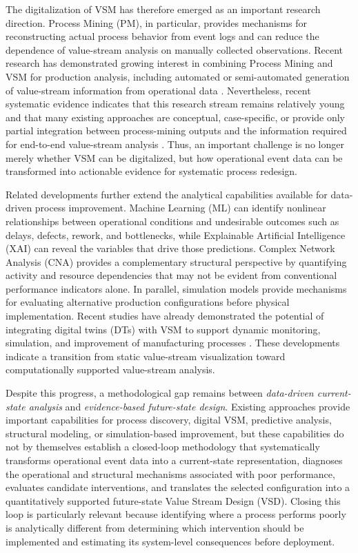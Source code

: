 \documentclass[pdflatex,iicol,Numbered,sn-basic]{sn-jnl}
\begin{document}
The digitalization of VSM has therefore emerged as an important research
direction. Process Mining (PM), in particular, provides mechanisms for
reconstructing actual process behavior from event logs and can reduce the
dependence of value-stream analysis on manually collected observations.
Recent research has demonstrated growing interest in combining Process Mining
and VSM for production analysis, including automated or semi-automated
generation of value-stream information from operational data
\cite{Teriete2026VSMProcessMining}. Nevertheless, recent systematic evidence indicates
that this research stream remains relatively young and that many existing
approaches are conceptual, case-specific, or provide only partial integration
between process-mining outputs and the information required for end-to-end
value-stream analysis \cite{Teriete2026VSMProcessMining}. Thus, an important challenge
is no longer merely whether VSM can be digitalized, but how operational event
data can be transformed into actionable evidence for systematic process
redesign.

Related developments further extend the analytical capabilities available for
data-driven process improvement. Machine Learning (ML) can identify nonlinear
relationships between operational conditions and undesirable outcomes such as
delays, defects, rework, and bottlenecks, while Explainable Artificial
Intelligence (XAI) can reveal the variables that drive those predictions.
Complex Network Analysis (CNA) provides a complementary
structural perspective by quantifying activity and resource dependencies that
may not be evident from conventional performance indicators alone. In parallel,
simulation models provide mechanisms for
evaluating alternative production configurations before physical implementation.
Recent studies have already demonstrated the potential of integrating digital twins (DTs)
with VSM to support dynamic monitoring, simulation, and improvement of
manufacturing processes \cite{Reslan2025VSMDigitalTwin}. These developments indicate
a transition from static value-stream visualization toward computationally
supported value-stream analysis.

Despite this progress, a methodological gap remains between \emph{data-driven
current-state analysis} and \emph{evidence-based future-state design}. Existing
approaches provide important capabilities for process discovery, digital VSM,
predictive analysis, structural modeling, or simulation-based improvement, but
these capabilities do not by themselves establish a closed-loop methodology
that systematically transforms operational event data into a current-state
representation, diagnoses the operational and structural mechanisms associated
with poor performance, evaluates candidate interventions, and translates the
selected configuration into a quantitatively supported future-state Value Stream
Design (VSD). Closing this loop is particularly relevant because identifying
where a process performs poorly is analytically different from determining
which intervention should be implemented and estimating its system-level
consequences before deployment.
\end{document}
